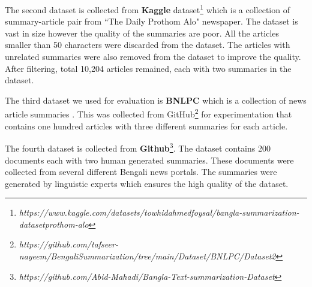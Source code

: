 \documentclass[acmlarge]{acmart}
\begin{document}
The second dataset is collected from \textbf{Kaggle} dataset\footnote{\textit{https://www.kaggle.com/datasets/towhidahmedfoysal/bangla-summarization-datasetprothom-alo}} which is a collection of summary-article pair from ``The Daily Prothom Alo" newspaper. The dataset is vast in size however the quality of the summaries are poor. All the articles smaller than 50 characters were discarded from the dataset. The articles with unrelated summaries were also removed from the dataset to improve the quality. After filtering, total 10,204 articles remained, each with two summaries in the dataset.

The third dataset we used for evaluation is \textbf{BNLPC} which is a collection of news article summaries \cite{Hque-2015-BNLPC-Dataset}. This was collected from GitHub\footnote{\textit{https://github.com/tafseer-nayeem/BengaliSummarization/tree/main/Dataset/BNLPC/Dataset2}} for experimentation that contains one hundred articles with three different summaries for each article.

The fourth dataset is collected from \textbf{Github}\footnote{\textit{https://github.com/Abid-Mahadi/Bangla-Text-summarization-Dataset}}. The dataset contains 200 documents each with two human generated summaries. These documents were collected from several different Bengali news portals. The summaries were generated by linguistic experts which ensures the high quality of the dataset.
\end{document}
